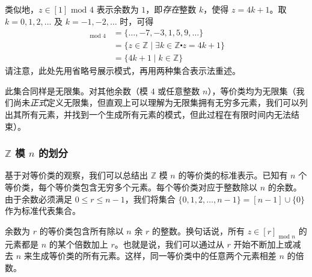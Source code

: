 类似地，$z \in [1]{\text{\ mod\ } 4}$ 表示余数为 $1$，即\emph{存在}整数 $k$，使得 $z = 4k + 1$。取 $k = 0,1,2,\dots$ 及 $k = -1,-2,\dots$ 时，可得
\begin{align*}
    [1]_{\text{\ mod\ } 4} &= \{\dots , -7, -3, 1, 5, 9, \dots \} \\
    &= \{z \in \mathbb{Z} \mid \exists k \in \mathbb{Z} \centerdot z = 4k + 1\} \\
    &= \{4k + 1 \mid k \in \mathbb{Z}\}
\end{align*}
请注意，此处先用省略号展示模式，再用两种集合表示法重述。

此集合同样是无限集。对其他余数（模 $4$ 或任意整数 $n$），等价类均为无限集（我们尚未\emph{正式}定义无限集，但直观上可以理解为无限集拥有无穷多元素，我们可以列出其所有元素，并找到一个生成所有元素的模式，但此过程在有限时间内无法结束）。

\subsubsection*{$\mathbb{Z}$ 模 $n$ 的划分}

基于对等价类的观察，我们可以总结出 $\mathbb{Z}$ 模 $n$ 的等价类的标准表示。已知有 $n$ 个等价类，每个等价类包含无穷多个元素。每个等价类对应于整数除以 $n$ 的余数。由于余数必须满足 $0 \le r \le n-1$，我们将集合 $\{0, 1, 2, \dots , n-1\} = [n-1] \cup \{0\}$ 作为标准代表集合。

余数为 $r$ 的等价类包含所有除以 $n$ 余 $r$ 的整数。换句话说，所有 $z \in [r]_{\text{\ mod\ } n}$ 的元素都是 $n$ 的某个倍数加上 $r$。也就是说，我们可以通过从 $r$ 开始不断加上或减去 $n$ 来生成等价类的所有元素。这样，同一等价类中的任意两个元素相差 $n$ 的倍数。

